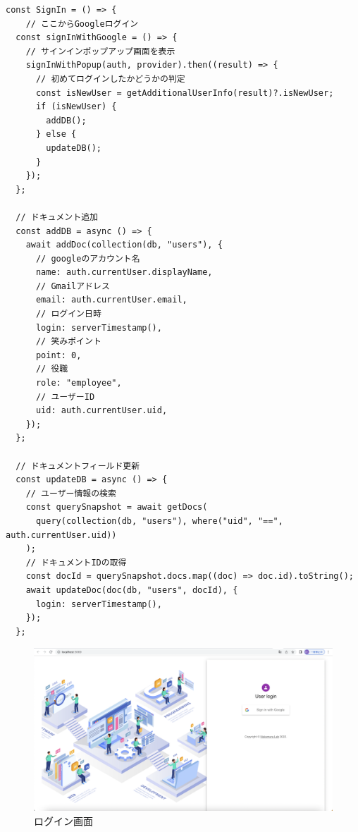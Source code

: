 \begin{lstlisting}[caption=Googleログインの実装]
  const SignIn = () => {
    // ここからGoogleログイン
  const signInWithGoogle = () => {
    // サインインポップアップ画面を表示
    signInWithPopup(auth, provider).then((result) => {
      // 初めてログインしたかどうかの判定
      const isNewUser = getAdditionalUserInfo(result)?.isNewUser;
      if (isNewUser) {
        addDB();
      } else {
        updateDB();
      }
    });
  };

  // ドキュメント追加
  const addDB = async () => {
    await addDoc(collection(db, "users"), {
      // googleのアカウント名
      name: auth.currentUser.displayName,
      // Gmailアドレス
      email: auth.currentUser.email,
      // ログイン日時
      login: serverTimestamp(),
      // 笑みポイント
      point: 0,
      // 役職
      role: "employee",
      // ユーザーID
      uid: auth.currentUser.uid,
    });
  };

  // ドキュメントフィールド更新
  const updateDB = async () => {
    // ユーザー情報の検索
    const querySnapshot = await getDocs(
      query(collection(db, "users"), where("uid", "==", auth.currentUser.uid))
    );
    // ドキュメントIDの取得
    const docId = querySnapshot.docs.map((doc) => doc.id).toString();
    await updateDoc(doc(db, "users", docId), {
      login: serverTimestamp(),
    });
  };
\end{lstlisting}

\vspace{17mm}

\begin{figure}[!h]
\begin{center}
  \includegraphics[scale=0.3, clip]{./img/sample13.png}
  \caption{ログイン画面}
  \label{fig:図の名前}
\end{center}
\end{figure}

